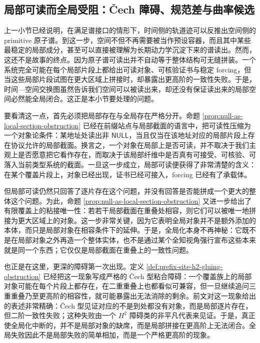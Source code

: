 \subsection{局部可读而全局受阻：Čech 障碍、规范差与曲率候选}\label{subsec:physical-spacetime-skeleton-local-global-obstruction}

上一小节已经说明，在满足谱接口的情形下，时间侧的轨道迹可以反推出空间侧的 primitive 原子谱。到这一步，空间不但不再需要被当作预设容器，而且其中某些最稳定的局部成分，甚至可以直接被理解为长期动力学沉淀下来的谱读出。然而，这还不是故事的终点。因为原子谱可读出并不自动等于整体结构可无缝拼装。一个系统完全可能在每个局部片段上都给出可读对象、可核验证书与稳定 forcing，但当这些局部片段试图在更大区域上拼接时，却暴露出更高阶的一致性失败。于是，时间—空间交换图虽然告诉我们空间可以被读出来，却还没有保证读出来的局部空间必然能全局闭合。这正是本小节要处理的问题。

要看清这一点，首先必须把局部存在与全局存在严格分开。命题 \ref{prop:null-as-local-section-obstruction} 已经在前缀站点与局部截面的语言中，把可读性压缩为一个对象论条件：某地址处读出非 \(\mathsf{NULL}\)，当且仅当在该地址对应的局部片段上存在协议允许的局部截面。换言之，一个对象在局部上是否可读，并不取决于我们主观上是否愿意把它看作存在，而取决于该局部纤维中是否真有可接受、可核验、可落入当前类型系统的截面。一旦这一步成立，局部可读便获得了非常清楚的含义：在某个覆盖片段上，对象已经出现，证书已经可接入，forcing 已经有了承载体。

但局部可读仍然只回答了逐片存在这个问题，并没有回答是否能拼成一个更大的整体这个问题。为此，命题 \ref{prop:null-as-local-section-obstruction} 又进一步给出了有限覆盖上的粘接唯一性：若若干局部截面在重叠处相容，则它们可以被唯一地拼接为更大区域上的对象。这一步非常关键，因为它表明全局对象并不是额外添加的本体，而只是局部对象在相容条件下的延伸。于是，全局化本身不再神秘：它既不是在局部对象之外再造一个整体实体，也不是通过某个全知视角强行宣布这些本来就是同一个东西；它仅仅是局部截面在重叠上的一致性问题。

也正是在这里，更深的障碍第一次出现。定义 \ref{def:prefix-site-h2-gluing-obstruction} 已经把这一现象写成严格的 Čech 型粘合障碍：一个覆盖族上的局部对象可能在每个片段上都存在，在二重重叠上也都看似可兼容，但一旦继续追问三重重叠乃至更高阶的相容性，就可能暴露出无法消除的剩余。前文对这一现象给出的表述非常精确：Čech 型见证对应的不是到处都没有对象，而是局部逐片存在，但二阶一致性失败；这种失败由一个 \(H^2\) 障碍类的非平凡代表来见证。于是，真正使全局化中断的，并不是局部对象的缺席，而是局部拼接在更高阶上无法闭合。全局失败因此不是局部失败的简单相加，而是一个严格更高阶的现象。

